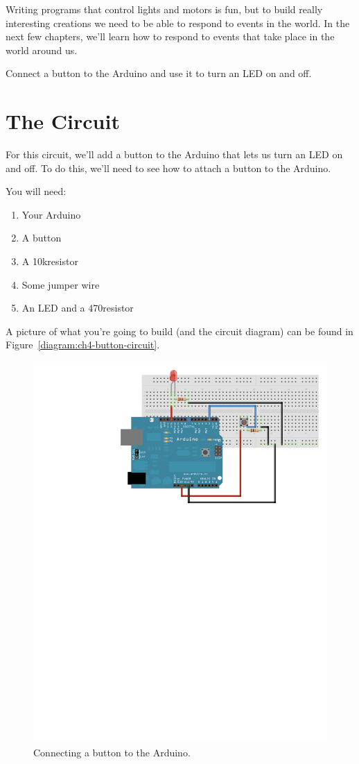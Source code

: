 Writing programs that control lights and motors is fun, but to build really interesting creations we need to be able to respond to events in the world. In the next few chapters, we'll learn how to respond to events that take place in the world around us.

\GOALS
Connect a button to the Arduino and use it to turn an LED on and off.

\section{The Circuit}
For this circuit, we'll add a button to the Arduino that lets us turn an LED on and off. To do this, we'll need to see how to attach a button to the Arduino.

You will need:
\begin{enumerate}
	\item Your Arduino
	\item A button
	\item A 10k\ohm resistor
	\item Some jumper wire
	\item An LED and a 470\ohm resistor
\end{enumerate}

A picture of what you're going to build (and the circuit diagram) can be found in Figure~\vref{diagram:ch4-button-circuit}.

\begin{figure}[ht]
  \begin{center}
    \includegraphics[width=0.8\linewidth]{images/ch4-button-circuit}
    \caption{Connecting a button to the Arduino.}
    \label{diagram:ch4-button-circuit}
  \end{center}
\end{figure}

